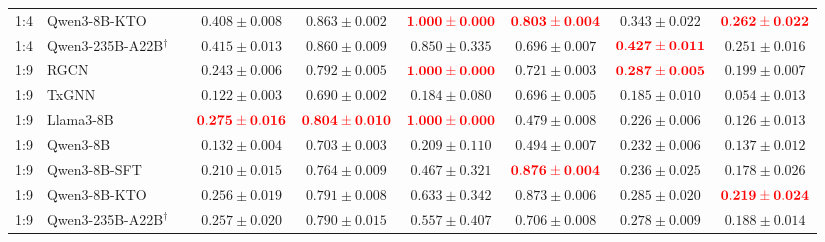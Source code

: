 \documentclass[pdflatex,sn-mathphys-num]{sn-jnl}
\begin{document}
\begin{landscape}
\begin{longtable}{clccccccc}
1:4 & Qwen3-8B-KTO &  & \(0.408 \pm 0.008\) & \(\mathbf{0.863 \pm 0.002}\) & \(\textcolor{red}{\mathbf{1.000 \pm 0.000}}\) & \(\textcolor{red}{\mathbf{0.803 \pm 0.004}}\) & \(0.343 \pm 0.022\) & \(\textcolor{red}{\mathbf{0.262 \pm 0.022}}\) \\
1:4 & Qwen3-235B-A22B$^{\dagger}$ &  & \(\mathbf{0.415 \pm 0.013}\) & \(0.860 \pm 0.009\) & \(\mathbf{0.850 \pm 0.335}\) & \(0.696 \pm 0.007\) & \(\textcolor{red}{\mathbf{0.427 \pm 0.011}}\) & \(\mathbf{0.251 \pm 0.016}\) \\
\midrule
1:9 & RGCN &  & \(0.243 \pm 0.006\) & \(\mathbf{0.792 \pm 0.005}\) & \(\textcolor{red}{\mathbf{1.000 \pm 0.000}}\) & \(0.721 \pm 0.003\) & \(\textcolor{red}{\mathbf{0.287 \pm 0.005}}\) & \(\mathbf{0.199 \pm 0.007}\) \\
1:9 & TxGNN &  & \(0.122 \pm 0.003\) & \(0.690 \pm 0.002\) & \(0.184 \pm 0.080\) & \(0.696 \pm 0.005\) & \(0.185 \pm 0.010\) & \(0.054 \pm 0.013\) \\
1:9 & Llama3-8B &  & \(\textcolor{red}{\mathbf{0.275 \pm 0.016}}\) & \(\textcolor{red}{\mathbf{0.804 \pm 0.010}}\) & \(\textcolor{red}{\mathbf{1.000 \pm 0.000}}\) & \(0.479 \pm 0.008\) & \(0.226 \pm 0.006\) & \(0.126 \pm 0.013\) \\
1:9 & Qwen3-8B &  & \(0.132 \pm 0.004\) & \(0.703 \pm 0.003\) & \(0.209 \pm 0.110\) & \(0.494 \pm 0.007\) & \(0.232 \pm 0.006\) & \(0.137 \pm 0.012\) \\
1:9 & Qwen3-8B-SFT &  & \(0.210 \pm 0.015\) & \(0.764 \pm 0.009\) & \(0.467 \pm 0.321\) & \(\textcolor{red}{\mathbf{0.876 \pm 0.004}}\) & \(0.236 \pm 0.025\) & \(0.178 \pm 0.026\) \\
1:9 & Qwen3-8B-KTO &  & \(0.256 \pm 0.019\) & \(0.791 \pm 0.008\) & \(\mathbf{0.633 \pm 0.342}\) & \(\mathbf{0.873 \pm 0.006}\) & \(\mathbf{0.285 \pm 0.020}\) & \(\textcolor{red}{\mathbf{0.219 \pm 0.024}}\) \\
1:9 & Qwen3-235B-A22B$^{\dagger}$ &  & \(\mathbf{0.257 \pm 0.020}\) & \(0.790 \pm 0.015\) & \(0.557 \pm 0.407\) & \(0.706 \pm 0.008\) & \(0.278 \pm 0.009\) & \(0.188 \pm 0.014\) \\
\end{longtable}
\end{landscape}
\end{document}
